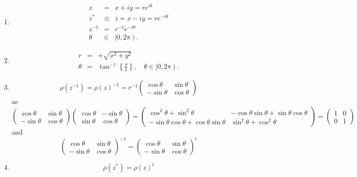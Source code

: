 \documentclass[aps,preprint]{revtex4}
\begin{document}
\begin{enumerate}
\item 
\begin{eqnarray}
z &=&x+iy=re^{i\theta } \\
z^{\ast } &\equiv &\overline{z}=x-iy=re^{-i\theta } \\
z^{-1} &=&r^{-1}e^{-i\theta } \\
\theta &\in &\left\vert 0,2\pi \right) .
\end{eqnarray}

\item 
\begin{eqnarray}
r &=&+\sqrt{x^{2}+y^{2}} \\
\theta &=&\tan ^{-1}\left\{ \frac{y}{x}\right\} ,\quad \theta \in \left\vert
0,2\pi \right) .
\end{eqnarray}

\item 
\begin{equation}
\rho \left( z^{-1}\right) =\rho \left( z\right) ^{-1}=r^{-1}\left( 
\begin{array}{cc}
\cos \theta & \sin \theta \\ 
-\sin \theta & \cos \theta%
\end{array}%
\right)
\end{equation}%
as 
\begin{equation}
\left( 
\begin{array}{cc}
\cos \theta & \sin \theta \\ 
-\sin \theta & \cos \theta%
\end{array}%
\right) \left( 
\begin{array}{cc}
\cos \theta & -\sin \theta \\ 
\sin \theta & \cos \theta%
\end{array}%
\right) =\left( 
\begin{array}{cc}
\cos ^{2}\theta +\sin ^{2}\theta & -\cos \theta \sin \theta +\sin \theta
\cos \theta \\ 
-\sin \theta \cos \theta +\cos \theta \sin \theta & \sin ^{2}\theta +\cos
^{2}\theta%
\end{array}%
\right) =\left( 
\begin{array}{cc}
1 & 0 \\ 
0 & 1%
\end{array}%
\right)
\end{equation}%
and 
\begin{equation}
\left( 
\begin{array}{cc}
\cos \theta & \sin \theta \\ 
-\sin \theta & \cos \theta%
\end{array}%
\right) ^{-1}=\left( 
\begin{array}{cc}
\cos \theta & \sin \theta \\ 
-\sin \theta & \cos \theta%
\end{array}%
\right) ^{t}
\end{equation}

\item 
\begin{equation}
\rho \left( z^{\ast }\right) =\rho \left( z\right) ^{t}
\end{equation}
\end{enumerate}
\end{document}
